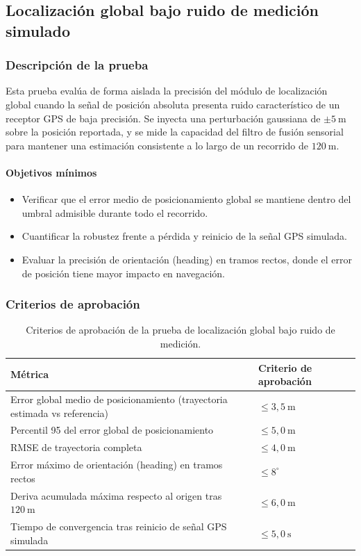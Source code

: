 \subsection{Localización global bajo ruido de medición simulado}

\subsubsection{Descripción de la prueba}

Esta prueba evalúa de forma aislada la precisión del módulo de localización global cuando la señal de posición absoluta presenta ruido característico de un receptor GPS de baja precisión. Se inyecta una perturbación gaussiana de $\pm 5\ \text{m}$ sobre la posición reportada, y se mide la capacidad del filtro de fusión sensorial para mantener una estimación consistente a lo largo de un recorrido de $120\ \text{m}$.

\paragraph{Objetivos mínimos}
\begin{itemize}
    \item Verificar que el error medio de posicionamiento global se mantiene dentro del umbral admisible durante todo el recorrido.
    \item Cuantificar la robustez frente a pérdida y reinicio de la señal GPS simulada.
    \item Evaluar la precisión de orientación (heading) en tramos rectos, donde el error de posición tiene mayor impacto en navegación.
\end{itemize}

\subsubsection{Criterios de aprobación}

\begin{table}[H]
\centering
\small
\begin{tabular}{p{8.8cm} p{4.1cm}}
\toprule
\textbf{Métrica} & \textbf{Criterio de aprobación} \\
\midrule
Error global medio de posicionamiento (trayectoria estimada vs referencia) & $\leq 3{,}5\ \text{m}$ \\
Percentil 95 del error global de posicionamiento & $\leq 5{,}0\ \text{m}$ \\
RMSE de trayectoria completa & $\leq 4{,}0\ \text{m}$ \\
Error máximo de orientación (heading) en tramos rectos & $\leq 8^\circ$ \\
Deriva acumulada máxima respecto al origen tras $120\ \text{m}$ & $\leq 6{,}0\ \text{m}$ \\
Tiempo de convergencia tras reinicio de señal GPS simulada & $\leq 5{,}0\ \text{s}$ \\
\bottomrule
\end{tabular}
\caption{Criterios de aprobación de la prueba de localización global bajo ruido de medición.}
\label{tab:criterios_prueba_localizacion}
\end{table}

